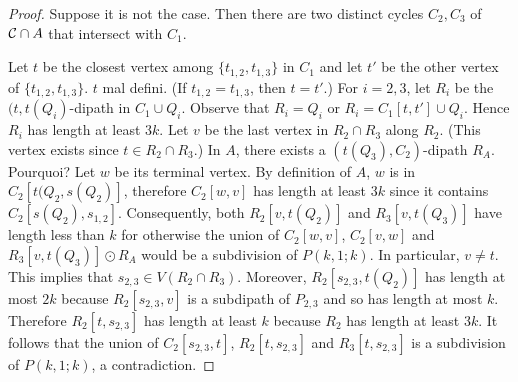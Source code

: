 \documentclass[utf8,10pt]{article}
\theoremstyle{plain}
\theoremstyle{definition}
\theoremstyle{remark}
\newcommand{\FH}[1]{{\color{red}{\bf Fred:} #1}}
\begin{document}
\begin{proof}
Suppose it is not the case. Then there are two distinct cycles $C_2, C_3$ of ${\cal C}\cap A$ that intersect with $C_1$.

Let $t$ be the closest vertex among $\{t_{1,2}, t_{1,3}\}$ in $C_1$ and let $t'$ be the other vertex of $\{t_{1,2}, t_{1,3}\}$. \FH{$t$ mal defini.}
(If $t_{1,2}=t_{1,3}$, then $t=t'$.) For $i=2,3$, let $R_i$ be the $(t,t(Q_i)$-dipath in $C_1\cup Q_i$. Observe that $R_i=Q_i$ or $R_i=C_1[t,t']\cup Q_i$. Hence $R_i$ has length at least $3k$.
Let $v$ be the last vertex in $R_2\cap R_3$ along $R_2$. (This vertex exists since $t\in R_2\cap R_3$.) In $A$, there exists a $(t(Q_3), C_2)$-dipath $R_A$. \FH{Pourquoi?} Let $w$ be its terminal vertex. By definition of $A$, $w$ is in $C_2[t(Q_2, s(Q_2)]$, therefore $C_2[w,v]$ has length at least $3k$ since it contains $C_2[s(Q_2), s_{1,2}]$. Consequently, both $R_2[v,t(Q_2)]$ and $R_3[v,t(Q_3)]$ have length less than $k$ for otherwise the union of $C_2[w,v]$, $C_2[v,w]$ and $R_3[v,t(Q_3)]\odot R_A$ would be a subdivision of $P(k,1;k)$.
In particular, $v\neq t$. This implies that $s_{2,3}\in V(R_2\cap R_3)$.
Moreover, $R_2[s_{2,3}, t(Q_2)]$ has length at most $2k$ because $R_2[s_{2,3},v]$ is a subdipath of $P_{2,3}$ and so has length at most $k$.
Therefore $R_2[t,s_{2,3}]$ has length at least $k$ because $R_2$ has length at least $3k$.
It follows that the union of $C_2[s_{2,3},t]$,  $R_2[t,s_{2,3}]$ and  $R_3[t,s_{2,3}]$ is a subdivision of $P(k,1;k)$, a contradiction.
\end{proof}
\end{document}
